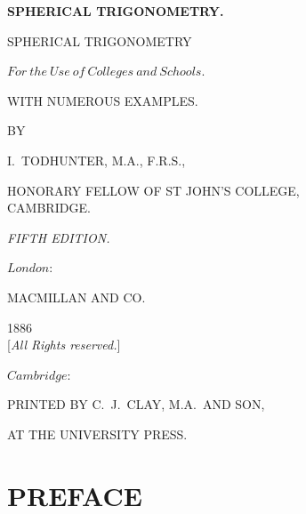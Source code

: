 \documentclass{book}[2004/02/16]
\providecommand{\mathfrak}[1]{#1}
\begin{document}
\begin{frontmatter}
\begin{titlepage}
\begin{center}
\Huge \textbf{SPHERICAL
TRIGONOMETRY.}
\end{center}
\end{titlepage}
\begin{titlepage}
\begin{center}
\large
\bigskip
{\huge SPHERICAL TRIGONOMETRY}
\bigskip
\bigskip

{\LARGE $\mathfrak{For\ the\ Use\ of\ Colleges\ and\ Schools.}$}
\bigskip
\bigskip

WITH NUMEROUS EXAMPLES.
\bigskip
\bigskip
\vfill

{\normalsize BY}\\
\bigskip

{\LARGE I.~TODHUNTER, M.A., F.R.S.,}\\
\bigskip

{\normalsize HONORARY FELLOW OF ST JOHN'S COLLEGE,\\
CAMBRIDGE.}
\bigskip
\bigskip

\vfill
\textit{FIFTH EDITION.}
\bigskip
\bigskip

\vfill
$\mathfrak{London:}$

MACMILLAN AND CO.

1886\\

[\textit{All Rights reserved.}]
\end{center}
\end{titlepage}

\begin{center}
\large
$\mathfrak{Cambridge}$:

\normalsize
PRINTED BY C.~J.\ CLAY, M.A.\ AND SON,

AT THE UNIVERSITY PRESS.
\end{center}


\chapter*{PREFACE}


\end{frontmatter}
\end{document}
